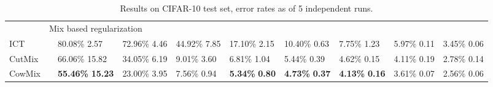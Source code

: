 \documentclass{article}
\newcommand{\eb}[1]{\scriptsize\,\,#1}
\begin{document}
\begin{table*}[t]
\begin{center}
{\begin{tabular}{@{ }llllllllll@{ }}
&\multicolumn{9}{l}{\footnotesize{Mix based regularization}}\\
ICT                   &              & 80.08\%\eb{2.57}      & 72.96\%\eb{4.46}      & 44.92\%\eb{7.85}      & 17.10\%\eb{2.15}      & 10.40\%\eb{0.63}      & \hphantom{0}7.75\%\eb{1.23}      & \hphantom{0}5.97\%\eb{0.11}      & \hphantom{0}3.45\%\eb{0.06} \\ 
CutMix                &              & 66.06\%\eb{15.82}      & 34.05\%\eb{6.19}      & \hphantom{0}9.01\%\eb{3.60}      & \hphantom{0}6.81\%\eb{1.04}      & \hphantom{0}5.44\%\eb{0.39}      & \hphantom{0}4.62\%\eb{0.15}      & \hphantom{0}4.11\%\eb{0.19}      & \hphantom{0}2.78\%\eb{0.14} \\ 
CowMix                &              & \bf55.46\%\eb{15.23}      & 23.00\%\eb{3.95}      & \hphantom{0}7.56\%\eb{0.94}      & \hphantom{0}\bf5.34\%\eb{0.80}      & \hphantom{0}\bf4.73\%\eb{0.37}      & \hphantom{0}\bf4.13\%\eb{0.16}      & \hphantom{0}3.61\%\eb{0.07}      & \hphantom{0}2.56\%\eb{0.06} \\ 
\hline

\end{tabular}}\vspace*{-1mm}\caption{Results on CIFAR-10 test set, error rates as  of 5 independent runs.}
\label{tab:results:cifar10}
\end{center}
\end{table*}
\end{document}
